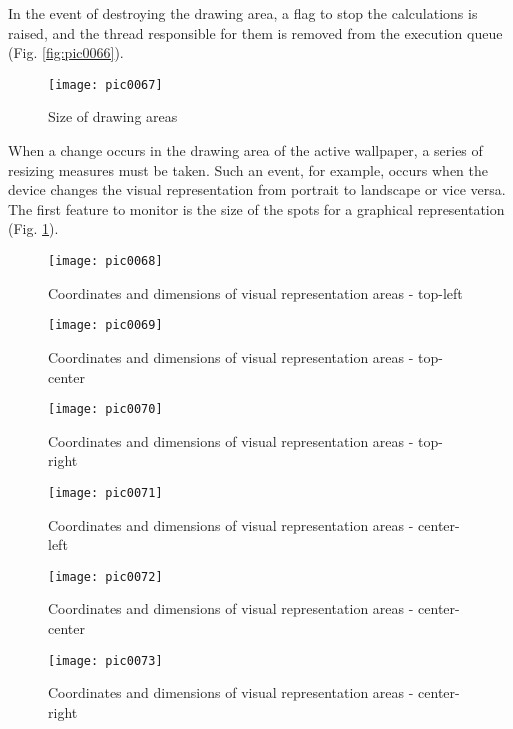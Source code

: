 In the event of destroying the drawing area, a flag to stop the calculations is raised, and the thread responsible for them is removed from the execution queue (Fig. \ref{fig:pic0066}).

\begin{figure}[h]
\centering
\texttt{[image: pic0067]}
\caption{Size of drawing areas}
\label{fig:pic0067}
\end{figure}
\FloatBarrier

When a change occurs in the drawing area of the active wallpaper, a series of resizing measures must be taken. Such an event, for example, occurs when the device changes the visual representation from portrait to landscape or vice versa. The first feature to monitor is the size of the spots for a graphical representation (Fig. \ref{fig:pic0067}).


\begin{figure}[h]
\centering
\texttt{[image: pic0068]}
\caption{Coordinates and dimensions of visual representation areas - top-left}
\label{fig:pic0068}
\end{figure}
\FloatBarrier

\begin{figure}[h]
\centering
\texttt{[image: pic0069]}
\caption{Coordinates and dimensions of visual representation areas - top-center}
\label{fig:pic0069}
\end{figure}
\FloatBarrier

\begin{figure}[h]
\centering
\texttt{[image: pic0070]}
\caption{Coordinates and dimensions of visual representation areas - top-right}
\label{fig:pic0070}
\end{figure}
\FloatBarrier

\begin{figure}[h]
\centering
\texttt{[image: pic0071]}
\caption{Coordinates and dimensions of visual representation areas - center-left}
\label{fig:pic0071}
\end{figure}
\FloatBarrier

\begin{figure}[h]
\centering
\texttt{[image: pic0072]}
\caption{Coordinates and dimensions of visual representation areas - center-center}
\label{fig:pic0072}
\end{figure}
\FloatBarrier

\begin{figure}[h]
\centering
\texttt{[image: pic0073]}
\caption{Coordinates and dimensions of visual representation areas - center-right}
\label{fig:pic0073}
\end{figure}
\FloatBarrier

